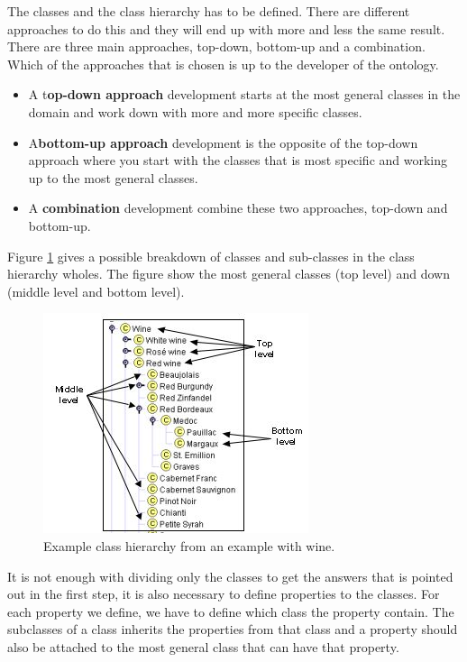 The classes and the class hierarchy has to be defined. There are different approaches to do this and they will end up with more and less the same result. There are three main approaches, top-down, bottom-up and a combination. Which of the approaches that is chosen is up to the developer of the ontology.
\begin{itemize}
	\item A {t\bf op-down approach} development starts at the most general classes in the domain and work down with more and more specific classes.
	\item A{\bf  bottom-up approach} development is the opposite of the top-down approach where you start with the classes that is most specific and working up to the most general classes.
	\item A {\bf combination} development combine these two approaches, top-down and bottom-up.
\end{itemize}

Figure \ref{fig:example_classhierachy} gives a possible breakdown of classes and sub-classes in the class hierarchy wholes. The figure show the most general classes (top level) and down (middle level and bottom level).

\begin{figure}[htb]
	\centering
	\includegraphics[scale=0.75]{figures/classhierarchical.jpg}
	\caption{Example class hierarchy from an example with wine.\cite{website:standford}}
	\label{fig:example_classhierachy}
\end{figure}

It is not enough with dividing only the classes to get the answers that is pointed out in the first step, it is also necessary to define properties to the classes. For each property we define, we have to define which class the property contain. The subclasses of a class inherits the properties from that class and a property should also be attached to the most general class that can have that property.

